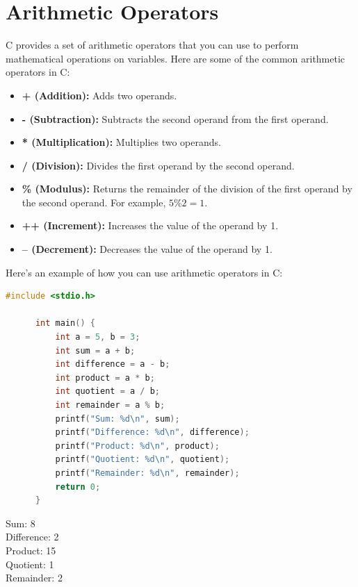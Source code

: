 \documentclass[12pt, openany]{book}
\begin{document}
  \section{Arithmetic Operators}
  C provides a set of arithmetic operators that you can use to perform mathematical operations on variables. Here are some of the common arithmetic operators in C:
  \begin{itemize}
      \item \textbf{+ (Addition):} Adds two operands.
      \item \textbf{- (Subtraction):} Subtracts the second operand from the first operand.
      \item \textbf{* (Multiplication):} Multiplies two operands.
      \item \textbf{/ (Division):} Divides the first operand by the second operand.
      \item \textbf{\% (Modulus):} Returns the remainder of the division of the first operand by the second operand. For example, $5 \% 2 = 1$.
      \item \textbf{++ (Increment):} Increases the value of the operand by 1.
      \item \textbf{-- (Decrement):} Decreases the value of the operand by 1.
  \end{itemize}
  
  Here's an example of how you can use arithmetic operators in C:
  \begin{lstlisting}[language=C, caption=Using Arithmetic Operators in C]
      #include <stdio.h>
      
      int main() {
          int a = 5, b = 3;
          int sum = a + b;
          int difference = a - b;
          int product = a * b;
          int quotient = a / b;
          int remainder = a % b;
          printf("Sum: %d\n", sum);
          printf("Difference: %d\n", difference);
          printf("Product: %d\n", product);
          printf("Quotient: %d\n", quotient);
          printf("Remainder: %d\n", remainder);
          return 0;
      }
  \end{lstlisting}
      
  \begin{tcolorbox}[colback=lightgray!10, colframe=black, title=Output]
      Sum: 8 \\
      Difference: 2 \\
      Product: 15 \\
      Quotient: 1 \\
      Remainder: 2
  \end{tcolorbox}
  
\end{document}
